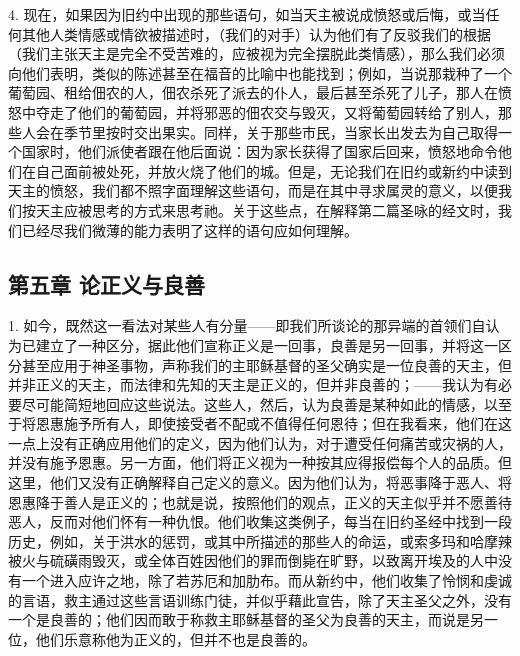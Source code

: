 4. 现在，如果因为旧约中出现的那些语句，如当天主被说成愤怒或后悔，或当任何其他人类情感或情欲被描述时，（我们的对手）认为他们有了反驳我们的根据（我们主张天主是完全不受苦难的，应被视为完全摆脱此类情感），那么我们必须向他们表明，类似的陈述甚至在福音的比喻中也能找到；例如，当说那栽种了一个葡萄园、租给佃农的人，佃农杀死了派去的仆人，最后甚至杀死了儿子，那人在愤怒中夺走了他们的葡萄园，并将邪恶的佃农交与毁灭，又将葡萄园转给了别人，那些人会在季节里按时交出果实。同样，关于那些市民，当家长出发去为自己取得一个国家时，他们派使者跟在他后面说：因为家长获得了国家后回来，愤怒地命令他们在自己面前被处死，并放火烧了他们的城。但是，无论我们在旧约或新约中读到天主的愤怒，我们都不照字面理解这些语句，而是在其中寻求属灵的意义，以便我们按天主应被思考的方式来思考祂。关于这些点，在解释第二篇圣咏的经文时，我们已经尽我们微薄的能力表明了这样的语句应如何理解。\par


\subsection{第五章 论正义与良善}

1. 如今，既然这一看法对某些人有分量——即我们所谈论的那异端的首领们自认为已建立了一种区分，据此他们宣称正义是一回事，良善是另一回事，并将这一区分甚至应用于神圣事物，声称我们的主耶稣基督的圣父确实是一位良善的天主，但并非正义的天主，而法律和先知的天主是正义的，但并非良善的；——我认为有必要尽可能简短地回应这些说法。这些人，然后，认为良善是某种如此的情感，以至于将恩惠施予所有人，即使接受者不配或不值得任何恩待；但在我看来，他们在这一点上没有正确应用他们的定义，因为他们认为，对于遭受任何痛苦或灾祸的人，并没有施予恩惠。另一方面，他们将正义视为一种按其应得报偿每个人的品质。但这里，他们又没有正确解释自己定义的意义。因为他们认为，将恶事降于恶人、将恩惠降于善人是正义的；也就是说，按照他们的观点，正义的天主似乎并不愿善待恶人，反而对他们怀有一种仇恨。他们收集这类例子，每当在旧约圣经中找到一段历史，例如，关于洪水的惩罚，或其中所描述的那些人的命运，或索多玛和哈摩辣被火与硫磺雨毁灭，或全体百姓因他们的罪而倒毙在旷野，以致离开埃及的人中没有一个进入应许之地，除了若苏厄和加肋布。而从新约中，他们收集了怜悯和虔诚的言语，救主通过这些言语训练门徒，并似乎藉此宣告，除了天主圣父之外，没有一个是良善的；他们因而敢于称救主耶稣基督的圣父为良善的天主，而说是另一位，他们乐意称他为正义的，但并不也是良善的。\par

